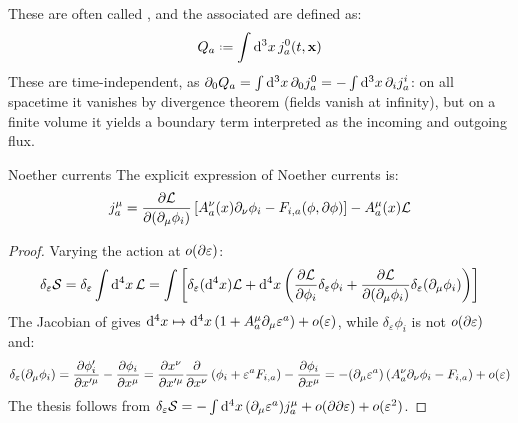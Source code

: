 These are often called , and the associated  are defined as:
\begin{equation}
  Q_a \defeq \int \dd^3 x\, j^0_a(t,\ve{x})
\end{equation}
These are time-independent, as $ \partial_0 Q_a = \int \mathrm{d}^3 x\, \partial_0 j^0_a = - \int \mathrm{d}^3 x\, \partial_i j^i_a $: on all spacetime it vanishes by divergence theorem (fields vanish at infinity), but on a finite volume it yields a boundary term interpreted as the incoming and outgoing flux.

\begin{proposition}{Noether currents}{}
  The explicit expression of Noether currents is:
  \begin{equation}
    j^\mu_a = \frac{\partial \mathcal{L}}{\partial (\partial_\mu \phi_i)} \left[ A^\nu_a(x) \partial_\nu \phi_i - F_{i,a}(\phi, \partial \phi) \right] - A^\mu_a(x) \mathcal{L}
    \label{eq:noether-current}
  \end{equation}
\end{proposition}

\begin{proofbox}
  \begin{proof}
    Varying the action at $ o(\partial \varepsilon) $:
    \begin{equation*}
        \delta_\varepsilon \mathcal{S} = \delta_\varepsilon \int \mathrm{d}^4 x\, \mathcal{L} = \int \left[ \delta_\varepsilon (\mathrm{d}^4 x) \mathcal{L} + \mathrm{d}^4 x \left( \frac{\partial \mathcal{L}}{\partial \phi_i} \delta_\varepsilon \phi_i + \frac{\partial \mathcal{L}}{\partial (\partial_\mu \phi_i)} \delta_\varepsilon (\partial_\mu \phi_i) \right) \right]
    \end{equation*}
    The Jacobian of  gives $ \mathrm{d}^4 x \mapsto \mathrm{d}^4 x \left( 1 + A^\mu_a \partial_\mu \varepsilon^a \right) + o(\varepsilon) $, while $ \delta_\varepsilon \phi_i $ is not $ o(\partial \varepsilon) $ and:
    \begin{equation*}
      \delta_\varepsilon (\partial_\mu \phi_i) = \frac{\partial \phi'_i}{\partial x'^\mu} - \frac{\partial \phi_i}{\partial x^\mu} = \frac{\partial x^\nu}{\partial x'^\mu} \frac{\partial}{\partial x^\nu} \left( \phi_i + \varepsilon^a F_{i,a} \right) - \frac{\partial \phi_i}{\partial x^\mu} = - (\partial_\mu \varepsilon^a) \left( A^\nu_a \partial_\nu \phi_i - F_{i,a} \right) + o(\varepsilon)
    \end{equation*}
    The thesis follows from $ \delta_\varepsilon \mathcal{S} = - \int \mathrm{d}^4 x\, (\partial_\mu \varepsilon^a) j^\mu_a + o(\partial \partial \varepsilon) + o(\varepsilon^2) $.
  \end{proof}
\end{proofbox}


